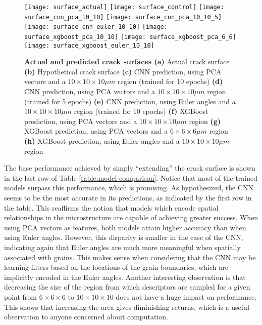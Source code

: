 \begin{figure}[b]
  \centering
    \texttt{[image: surface\_actual]} %
    \texttt{[image: surface\_control]} %
    \texttt{[image: surface\_cnn\_pca\_10\_10]} %
    \texttt{[image: surface\_cnn\_pca\_10\_10\_5]} %
    \texttt{[image: surface\_cnn\_euler\_10\_10]} %
    \texttt{[image: surface\_xgboost\_pca\_10\_10]} %
    \texttt{[image: surface\_xgboost\_pca\_6\_6]} %
    \texttt{[image: surface\_xgboost\_euler\_10\_10]} %
    \caption{\textbf{Actual and predicted crack surfaces (a)} Actual crack surface
             \textbf{(b)} Hypothetical crack surface
             \textbf{(c)} CNN prediction, using PCA vectors and a $10 \times 10 \times 10 \mu m$ region (trained for 10 epochs)
             \textbf{(d)} CNN prediction, using PCA vectors and a $10 \times 10 \times 10 \mu m$ region (trained for 5 epochs)
             \textbf{(e)} CNN prediction, using Euler angles and a $10 \times 10 \times 10 \mu m$ region (trained for 10 epochs)
             \textbf{(f)} XGBoost prediction, using PCA vectors and a $10 \times 10 \times 10 \mu m$ region
             \textbf{(g)} XGBoost prediction, using PCA vectors and a $6 \times 6 \times 6 \mu m$ region
             \textbf{(h)} XGBoost prediction, using Euler angles and a $10 \times 10 \times 10 \mu m$ region }
    \label{fig:surfaces}
\end{figure}

The base performance achieved by simply ``extending'' the crack surface is shown in the last row of Table \ref{table:model-comparison}.  Notice that most of the trained models surpass this performance, which is promising.  As hypothesized, the CNN seems to be the most accurate in its predictions, as indicated by the first row in the table.  This reaffirms the notion that models which encode spatial relationships in the microstructure are capable of achieving greater success.  When using PCA vectors as features, both models attain higher accuracy than when using Euler angles.  However, this disparity is smaller in the case of the CNN, indicating again that Euler angles are much more meaningful when spatially associated with grains.  This makes sense when considering that the CNN may be learning filters based on the locations of the grain boundaries, which are implicitly encoded in the Euler angles.  Another interesting observation is that decreasing the size of the region from which descriptors are sampled for a given point from $6 \times 6 \times 6$ to $10 \times 10 \times 10$ does not have a huge impact on performance.  This shows that increasing the area gives diminishing returns, which is a useful observation to anyone concerned about computation.

